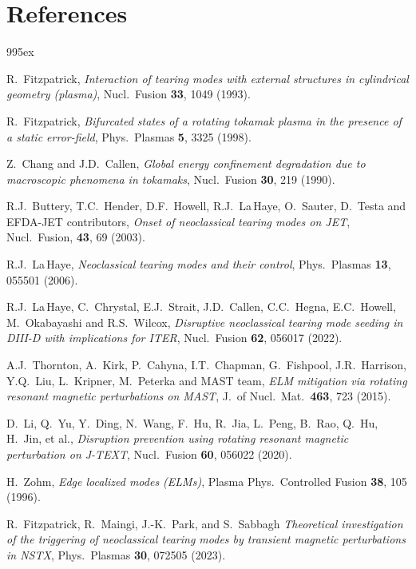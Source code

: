\documentclass[12pt,prb,aps]{revtex4-1}
\begin{document}
\section*{References}
\begin{thebibliography}{99}\baselineskip 5ex

 R.~Fitzpatrick, {\em Interaction of tearing modes with external structures in cylindrical geometry (plasma)}, Nucl.\ Fusion {\bf 33}, 1049 (1993).

 R.~Fitzpatrick,  {\em Bifurcated states of a rotating tokamak plasma in the presence of a static error-field}, Phys.\ Plasmas {\bf 5}, 3325 (1998).

  Z.~Chang and J.D.~Callen, {\em Global energy confinement degradation due to macroscopic phenomena in tokamaks}, Nucl.\ Fusion {\bf 30}, 219 (1990).

 R.J.~Buttery, T.C.~Hender, D.F.~Howell, R.J.~La\,Haye, O.~Sauter, D.~Testa and EFDA-JET contributors,  {\em Onset of neoclassical tearing modes on JET}, 
Nucl.\ Fusion, {\bf 43},  69  (2003).

 R.J.~La\,Haye, {\em Neoclassical tearing modes and their control}, Phys.\ Plasmas {\bf 13}, 055501 (2006).

 R.J.~La\,Haye, C.~Chrystal, E.J.~Strait, J.D.~Callen, C.C.~Hegna, E.C.~Howell, M.~Okabayashi and R.S.~Wilcox, 
{\em Disruptive neoclassical tearing mode seeding in DIII-D with implications for ITER}, 
Nucl.\ Fusion {\bf 62}, 056017 (2022). 

 A.J.~Thornton, A.~Kirk, P.~Cahyna, I.T.~Chapman, G.~Fishpool, J.R.~Harrison, Y.Q.~Liu, L.~Kripner, M.~Peterka and 
MAST team, {\em ELM mitigation via rotating resonant magnetic perturbations on MAST}, J.\ of Nucl.\ Mat.\ {\bf 463}, 723 (2015). 

  D.~Li, Q.~Yu, Y.~Ding, N.~Wang, F.~Hu, R.~Jia, L.~Peng, B.~Rao, Q.~Hu, H.~Jin, et al., {\em Disruption prevention using rotating resonant magnetic perturbation on J-TEXT}, Nucl.\ Fusion {\bf 60}, 056022 (2020). 

 H.~Zohm, {\em Edge localized modes (ELMs)}, Plasma Phys.\ Controlled Fusion {\bf 38}, 105 (1996).

 R.~Fitzpatrick, R.~Maingi, J.-K.~Park, and S.~Sabbagh
{\em Theoretical investigation of the triggering of neoclassical tearing modes by transient magnetic perturbations in NSTX}, 
Phys.\ Plasmas {\bf 30}, 072505 (2023).


\end{thebibliography}
\end{document}
